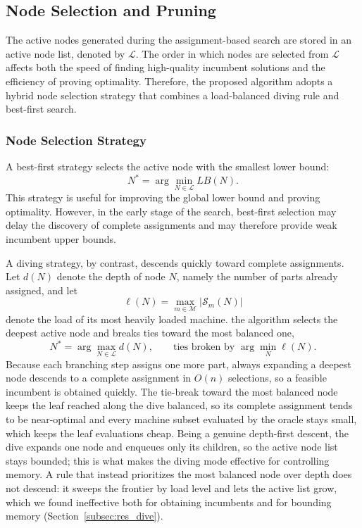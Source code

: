 \documentclass[review,3p,times,authoryear]{elsarticle}
\begin{document}
\subsection{Node Selection and Pruning}
\label{subsec:node_selection_pruning}

The active nodes generated during the assignment-based search are stored in
an active node list, denoted by $\mathcal{L}$. The order in which nodes are
selected from $\mathcal{L}$ affects both the speed of finding high-quality
incumbent solutions and the efficiency of proving optimality. Therefore,
the proposed algorithm adopts a hybrid node selection strategy that combines
a load-balanced diving rule and best-first search.

\subsubsection{Node Selection Strategy}

A best-first strategy selects the active node with the smallest lower bound:
\[
N^*=\arg\min_{N\in\mathcal{L}} LB(N).
\]
This strategy is useful for improving the global lower bound and proving
optimality. However, in the early stage of the search, best-first selection
may delay the discovery of complete assignments and may therefore provide
weak incumbent upper bounds.

A diving strategy, by contrast, descends quickly toward complete assignments.
Let $d(N)$ denote the depth of node $N$, namely the number of parts already
assigned, and let
\[
\ell(N)=\max_{m\in\mathcal{M}}\bigl|\mathcal{S}_m(N)\bigr|
\]
denote the load of its most heavily loaded machine. the algorithm selects the deepest active node and breaks ties toward the most
balanced one,
\[
N^*=\arg\max_{N\in\mathcal{L}} d(N),
\qquad\text{ties broken by }\arg\min_{N}\ell(N).
\]
Because each branching step assigns one more part, always expanding a deepest
node descends to a complete assignment in $O(n)$ selections, so a feasible
incumbent is obtained quickly. The tie-break toward the most balanced node keeps
the leaf reached along the dive balanced, so its complete assignment tends to be
near-optimal and every machine subset evaluated by the oracle stays small, which
keeps the leaf evaluations cheap. Being a genuine depth-first descent, the dive
expands one node and enqueues only its children, so the active node list stays
bounded; this is what makes the diving mode effective for controlling memory. A
rule that instead prioritizes the most balanced node over depth does not descend:
it sweeps the frontier by load level and lets the active list grow, which we
found ineffective both for obtaining incumbents and for bounding memory
(Section~\ref{subsec:res_dive}).
\end{document}
